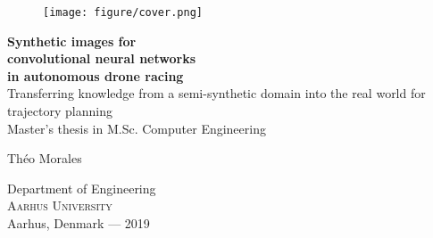 
\begin{titlepage}
			
\addtolength{\voffset}{2cm}

\begin{figure}[H]
\centering
\vspace{2cm}	%
\texttt{[image: figure/cover.png]}
\end{figure}

\mbox{}
\vfill
\renewcommand{\familydefault}{\sfdefault} \normalfont %
\textbf{{\Huge 	Synthetic images for \\[0.2cm] 
		convolutional neural networks \\[0.3cm]
		in autonomous drone racing }} 	\\[0.5cm]
{\Large Transferring knowledge from a semi-synthetic domain into the real world
for trajectory planning}\\[0.5cm]
Master's thesis in M.Sc. Computer Engineering \setlength{\parskip}{1cm}

{\Large Théo Morales \setlength{\parskip}{2.9cm}}

Department of Engineering \\
\textsc{Aarhus University} \\
Aarhus, Denmark — 2019

\renewcommand{\familydefault}{\rmdefault} \normalfont %
\end{titlepage}





